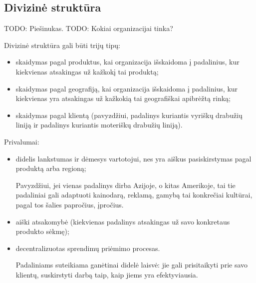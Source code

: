 \subsection{Divizinė struktūra}

TODO: Piešinukas.
TODO: Kokiai organizacijai tinka?

Divizinė struktūra gali būti trijų tipų:
\begin{itemize}
  \item skaidymas pagal produktus, kai organizacija išskaidoma į
    padalinius, kur kiekvienas atsakingas už kažkokį tai produktą;
  \item skaidymas pagal geografiją, kai organizacija išskaidoma
    į padalinius, kur kiekvienas yra atsakingas už kažkokią
    tai geografiškai apibrėžtą rinką;
  \item skaidymas pagal klientą (pavyzdžiui, padalinys kuriantis
    vyriškų drabužių liniją ir padalinys kuriantis moteriškų drabužių
    liniją).
\end{itemize}

Privalumai:
\begin{itemize}
  \item didelis lankstumas ir dėmesys vartotojui, nes yra aiškus
    pasiskirstymas pagal produktą arba regioną;
    \begin{exmp}
      Pavyzdžiui, jei vienas padalinys dirba Azijoje, o kitas Amerikoje,
      tai tie padaliniai gali adaptuoti kainodarą, reklamą, gamybą tai
      konkrečiai kultūrai, pagal tos šalies papročius, įpročius.
    \end{exmp}
  \item aiški atsakomybė (kiekvienas padalinys atsakingas už savo
    konkretaus produkto sėkmę);
  \item decentralizuotas sprendimų priėmimo procesas.
    \begin{note}
      Padaliniams suteikiama ganėtinai didelė laisvė: jie gali
      prisitaikyti prie savo klientų, suskirstyti darbą taip, kaip
      jiems yra efektyviausia.
    \end{note}
\end{itemize}

